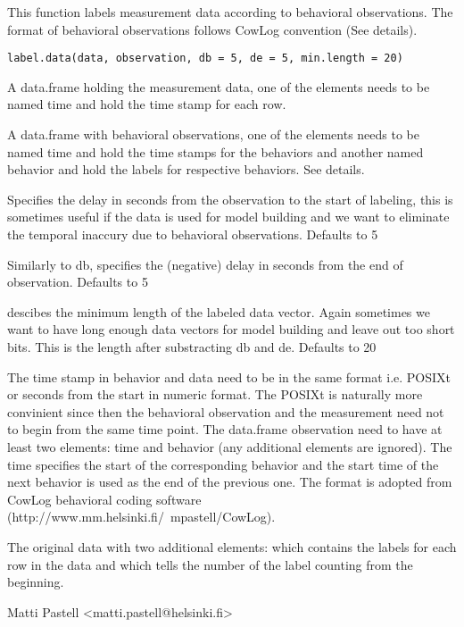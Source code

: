 \documentclass{book}
\begin{document}
\begin{Description}\relax
This function labels measurement data according to behavioral
observations. The format of behavioral observations follows CowLog
convention (See details).
\end{Description}
\begin{Usage}
\begin{verbatim}
label.data(data, observation, db = 5, de = 5, min.length = 20)
\end{verbatim}
\end{Usage}
\begin{Arguments}
\begin{ldescription}
\item[\code{data}] A data.frame holding the measurement data, one of the
elements needs to be named time and hold the time stamp for each row.
\item[\code{observation}] A data.frame with behavioral observations, one of
the elements needs to be named time and hold the time stamps for the
behaviors and another named behavior and hold the labels for
respective behaviors. See details.
\item[\code{db}] Specifies the delay in seconds from the observation to the start of
labeling, this is sometimes useful if the data is used for model
building and we want to eliminate the temporal inaccury due to
behavioral observations. Defaults to 5
\item[\code{de}] Similarly to db, specifies the (negative) delay in seconds
from the end of observation. Defaults to 5
\item[\code{min.length}] descibes the minimum length of
the labeled data vector. Again sometimes we want to have long enough
data vectors for model building and leave out too short bits. This is
the length after substracting db and de. Defaults to 20
\end{ldescription}
\end{Arguments}
\begin{Details}\relax
The time stamp in behavior and data need to be in the same format i.e. POSIXt or seconds from the start in numeric
format. The POSIXt is naturally more convinient since then the
behavioral observation and the measurement need not to begin from the
same time point.
The data.frame observation need to have at least two elements: time and
behavior (any additional elements are ignored). The time specifies the
start of the corresponding behavior and the start time of the next
behavior is used as the end of the previous one.
The format is adopted from CowLog behavioral coding software
(http://www.mm.helsinki.fi/~mpastell/CowLog).
\end{Details}
\begin{Value}
The original data with two additional elements:  which contains
the labels for each row in the data and  which tells the number of
the label counting from the beginning.
\end{Value}
\begin{Author}\relax
Matti Pastell <matti.pastell@helsinki.fi>
\end{Author}
\end{document}
